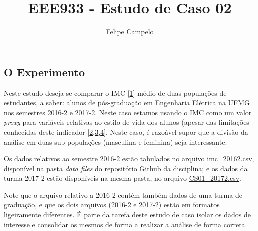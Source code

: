 \documentclass[11pt,twocolumn,printwatermark=false]{pinp}
\title{EEE933 - Estudo de Caso 02}
\author[a]{Felipe Campelo}
\affil[a]{Programa de Pós-Graduação em Engenharia Elétrica, UFMG.}
\begin{document}
\verticaladjustment{-2pt}

\maketitle
\thispagestyle{firststyle}



\subsection{O Experimento}\label{o-experimento}

Neste estudo deseja-se comparar o IMC
{[}\href{http://apps.who.int/bmi/index.jsp?introPage=intro_3.html}{1}{]}
médio de duas populações de estudantes, a saber: alunos de pós-graduação
em Engenharia Elétrica na UFMG nos semestres 2016-2 e 2017-2. Neste caso
estamos usando o IMC como um valor \emph{proxy} para variáveis relativas
ao estilo de vida dos alunos (apesar das limitações conhecidas deste
indicador
{[}\href{http://www.nytimes.com/interactive/projects/cp/summer-of-science-2015/latest/how-often-is-bmi-misleading}{2},\href{http://science.sciencemag.org/content/341/6148/856.summary}{3},\href{http://www.medicalnewstoday.com/articles/265215.php}{4}{]}.
Neste caso, é razoável supor que a divisão da análise em duas
sub-populações (masculina e feminina) seja interessante.

Os dados relativos ao semestre 2016-2 estão tabulados no arquivo
\href{https://raw.githubusercontent.com/fcampelo/Design-and-Analysis-of-Experiments/master/data\%20files/imc_20162.csv}{imc\_20162.csv},
disponível na pasta \emph{data files} do repositório Github da
disciplina; e os dados da turma 2017-2 estão disponíveis na mesma pasta,
no arquivo
\href{https://raw.githubusercontent.com/fcampelo/Design-and-Analysis-of-Experiments/master/data\%20files/CS01_20172.csv}{CS01\_20172.csv}.

Note que o arquivo relativo a 2016-2 contém também dados de uma turma de
graduação, e que os dois arquivos (2016-2 e 2017-2) estão em formatos
ligeiramente diferentes. É parte da tarefa deste estudo de caso isolar
os dados de interesse e consolidar os mesmos de forma a realizar a
análise de forma correta.
\end{document}
